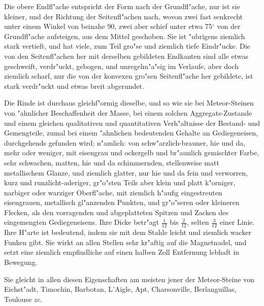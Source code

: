 \documentclass[a4paper, 11pt, oneside, german]{article}
\begin{document}
Die obere Endfl"ache entspricht der Form nach der Grundfl"ache, nur ist sie kleiner, und der Richtung der Seitenfl"achen nach, wovon zwei fast senkrecht unter einem Winkel von beinahe 90, zwei aber schief unter etwa 75$^{\circ}$ von der Grundfl"ache aufsteigen, aus dem Mittel geschoben. Sie ist "ubrigens ziemlich stark vertieft, und hat viele, zum Teil gro"se und ziemlich tiefe Eindr"ucke. Die von den Seitenfl"achen her mit derselben gebildeten Endkanten sind alle etwas geschweift, verdr"uckt, gebogen, und unregelm"a"sig im Verlaufe, aber doch ziemlich scharf, nur die von der konvexen gro"sen Seitenfl"ache her gebildete, ist stark verdr"uckt und etwas breit abgerundet.

Die Rinde ist durchaus gleichf"ormig dieselbe, und so wie sie bei Meteor-Steinen von "ahnlicher Beschaffenheit der Masse, bei einem solchen Aggregats-Zustande und einem gleichen qualitativen und quantitativen Verh"altnisse der Bestand- und Gemengteile, zumal bei einem "ahnlichen bedeutenden Gehalte an Gediegeneisen, durchgehends gefunden wird; n"amlich: von schw"arzlich-brauner, hie und da, mehr oder weniger, mit eisengrau und ockergelb und br"aunlich gemischter Farbe, sehr schwachen, matten, hie und da schimmernden, stellenweise matt metallischem Glanze, und ziemlich glatter, nur hie und da fein und verworren, kurz und runzlicht-aderiger, gr"o"sten Teils aber klein und platt k"orniger, narbiger oder warziger Oberfl"ache, mit ziemlich h"aufig eingestreuten eisengrauen, metallisch gl"anzenden Punkten, und gr"o"seren oder kleineren Flecken, als den vorragenden und abgeplatteten Spitzen und Zacken des eingemengten Gediegeneisens. Ihre Dicke betr"agt $\frac{1}{12}$ bis $\frac{2}{12}$, selten $\frac{3}{12}$ einer Linie. Ihre H"arte ist bedeutend, indem sie mit dem Stahle leicht und ziemlich wacker Funken gibt. Sie wirkt an allen Stellen sehr kr"aftig auf die Magnetnadel, und setzt eine ziemlich empfindliche auf einen halben Zoll Entfernung lebhaft in Bewegung.

Sie gleicht in allen diesen Eigenschaften am meisten jener der Meteor-Steine von Eichst"adt, Timochin, Barbotan, L'Aigle, Apt, Charsonville, Berlanguillas, Toulouse \emph{zc.}
\end{document}
